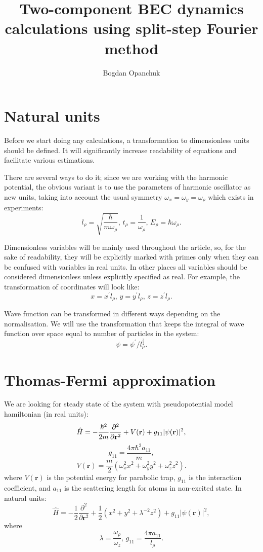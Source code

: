 \documentclass[12pt,notitlepage]{report}
\title{Two-component BEC dynamics calculations using split-step Fourier method}
\author{Bogdan Opanchuk}
\begin{document}
\maketitle

\section*{Natural units}

Before we start doing any calculations, a transformation to dimensionless units should be defined.
It will significantly increase readability of equations and facilitate various estimations.

There are several ways to do it; since we are working with the harmonic potential,
the obvious variant is to use the parameters of harmonic oscillator as new units,
taking into account the usual symmetry $\omega_x = \omega_y = \omega_\rho$ which exists in experiments:
\[ l_\rho =  \sqrt{\frac{\hbar}{m\omega_\rho}},\, t_\rho = \frac{1}{\omega_\rho},\, E_\rho = \hbar \omega_\rho. \]

Dimensionless variables will be mainly used throughout the article, so, for the sake of readability,
they will be explicitly marked with primes only when they can be confused with variables in real units.
In other places all variables should be considered dimensionless unless explicitly specified as real.
For example, the transformation of coordinates will look like:
\[ x = x^\prime l_\rho,\, y = y^\prime l_\rho,\, z = z^\prime l_\rho. \]

Wave function can be transformed in different ways depending on the normalisation.
We will use the transformation that keeps the integral of wave function over space equal to number of particles in the system:
\[ \psi = \psi^\prime / l_\rho^\frac{3}{2}. \]

\section*{Thomas-Fermi approximation}

We are looking for steady state of the system with pseudopotential model hamiltonian (in real units):
\[ 
\hat{H} = -\frac{\hbar^2}{2m} \frac{\partial^2}{\partial \mathbf{r}^2} + \\
V(\mathbf{r}) + g_{11} \vert \psi(\mathbf{r}) \vert^2,
\]
\[ g_{11} = \frac{4 \pi \hbar^2 a_{11}}{m}, \]
\[ V(\mathbf{r}) = \frac{m}{2} \left( \omega_x^2 x^2 + \omega_y^2 y^2 + \omega_z^2 z^2 \right). \]
where $V(\mathbf{r})$ is the potential energy for parabolic trap, $g_{11}$ is the interaction coefficient,
and $a_{11}$ is the scattering length for atoms in non-excited state. In natural units:
\[
\hat{H} = -\frac{1}{2} \frac{\partial^2}{\partial \mathbf{r}^2} + 
\frac{1}{2} \left( x^2 + y^2 + \lambda^{-2} z^2 \right) + g_{11} \vert \psi(\mathbf{r}) \vert^2,
\]
where
\[ \lambda = \frac{\omega_\rho}{\omega_z},\, g_{11} = \frac{4 \pi a_{11}}{l_\rho}. \]
\end{document}
